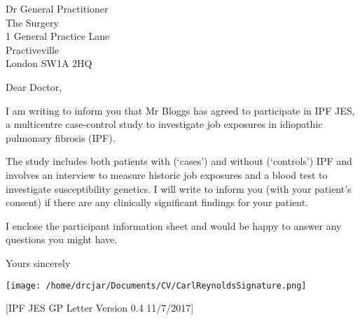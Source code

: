 \documentclass[imperial,letterpaper,pagesize,UScommercial9]{scrlttr2}
\begin{document}
\begin{letter}{Dr General Practitioner \\ The Surgery \\ 1 General Practice Lane \\ Practiveville \\ London SW1A 2HQ}


\opening{Dear Doctor,}

    I am writing to inform you that Mr Bloggs has agreed to participate in IPF JES, a multicentre case-control study to investigate job exposures in idiopathic pulmonary fibrosis (IPF).
    
    The study includes both patients with (`cases') and without (`controls') IPF and involves an interview to measure historic job exposures and a blood test to investigate susceptibility genetics. I will write to inform you (with your patient's consent) if there are any clinically significant findings for your patient. 
    
    I enclose the participant information sheet and would be happy to answer any questions you might have.




\closing{Yours sincerely}

    \texttt{[image: /home/drcjar/Documents/CV/CarlReynoldsSignature.png]}

    \vfill \hfill [IPF JES GP Letter Version 0.4 11/7/2017]

\end{letter}
\end{document}

